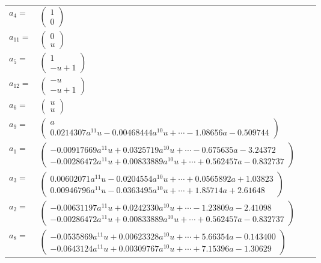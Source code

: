 \documentclass[1p]{elsarticle_modified}
\theoremstyle{definition}
\begin{document}
\begin{tabular}{m{7pt} m{180pt} m{7pt} m{180pt} }
\flushright $a_{4}=$&$\begin{pmatrix}1\\0\end{pmatrix}$ \\
\flushright $a_{11}=$&$\begin{pmatrix}0\\u\end{pmatrix}$ \\
\flushright $a_{5}=$&$\begin{pmatrix}1\\- u+1\end{pmatrix}$ \\
\flushright $a_{12}=$&$\begin{pmatrix}- u\\- u+1\end{pmatrix}$ \\
\flushright $a_{6}=$&$\begin{pmatrix}u\\u\end{pmatrix}$ \\
\flushright $a_{9}=$&$\begin{pmatrix}a\\0.0214307 a^{11} u-0.00468444 a^{10} u+\cdots-1.08656 a-0.509744\end{pmatrix}$ \\
\flushright $a_{1}=$&$\begin{pmatrix}-0.00917669 a^{11} u+0.0325719 a^{10} u+\cdots-0.675635 a-3.24372\\-0.00286472 a^{11} u+0.00833889 a^{10} u+\cdots+0.562457 a-0.832737\end{pmatrix}$ \\
\flushright $a_{3}=$&$\begin{pmatrix}0.00602071 a^{11} u-0.0204554 a^{10} u+\cdots+0.0565892 a+1.03823\\0.00946796 a^{11} u-0.0363495 a^{10} u+\cdots+1.85714 a+2.61648\end{pmatrix}$ \\
\flushright $a_{2}=$&$\begin{pmatrix}-0.00631197 a^{11} u+0.0242330 a^{10} u+\cdots-1.23809 a-2.41098\\-0.00286472 a^{11} u+0.00833889 a^{10} u+\cdots+0.562457 a-0.832737\end{pmatrix}$ \\
\flushright $a_{8}=$&$\begin{pmatrix}-0.0535869 a^{11} u+0.00623328 a^{10} u+\cdots+5.66354 a-0.143400\\-0.0643124 a^{11} u+0.00309767 a^{10} u+\cdots+7.15396 a-1.30629\end{pmatrix}$ \\

\end{tabular}
\end{document}
